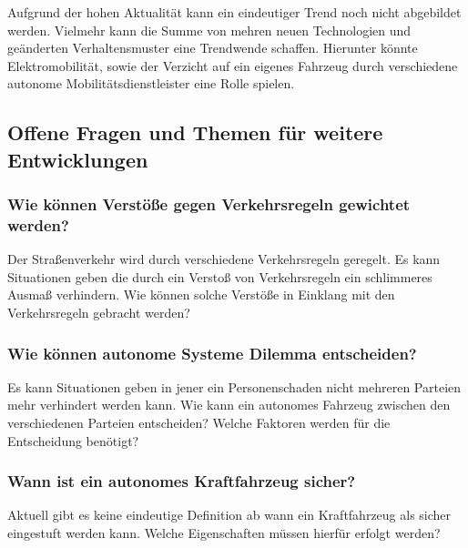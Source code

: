 Aufgrund der hohen Aktualität kann ein eindeutiger Trend noch nicht abgebildet werden.
Vielmehr kann die Summe von mehren neuen Technologien und geänderten Verhaltensmuster eine Trendwende schaffen.
Hierunter könnte Elektromobilität, sowie der Verzicht auf ein eigenes Fahrzeug durch verschiedene
autonome Mobilitätsdienstleister eine Rolle spielen.

\subsection{Offene Fragen und Themen für weitere Entwicklungen}
\subsubsection{Wie können Verstöße gegen Verkehrsregeln gewichtet werden?}

Der Straßenverkehr wird durch verschiedene Verkehrsregeln geregelt.
Es kann Situationen geben die durch ein Verstoß von Verkehrsregeln ein
schlimmeres Ausmaß verhindern.
Wie können solche Verstöße in Einklang mit den Verkehrsregeln gebracht werden?

\subsubsection{Wie können autonome Systeme Dilemma entscheiden?}
Es kann Situationen geben in jener ein Personenschaden nicht mehreren Parteien mehr verhindert werden kann.
Wie kann ein autonomes Fahrzeug zwischen den verschiedenen Parteien entscheiden?
Welche Faktoren werden für die Entscheidung benötigt?

\subsubsection{Wann ist ein autonomes Kraftfahrzeug sicher?}
Aktuell gibt es keine eindeutige Definition ab wann ein Kraftfahrzeug als sicher eingestuft werden kann.
Welche Eigenschaften müssen hierfür erfolgt werden?